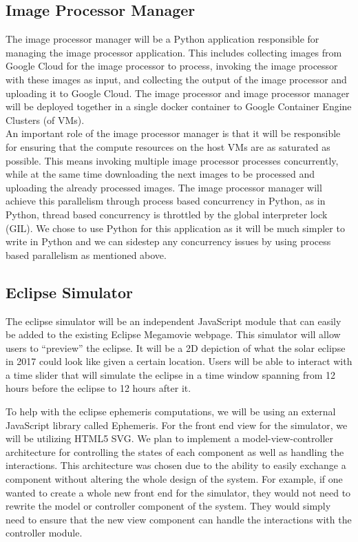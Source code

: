 \documentclass[10pt, onecolumn, draftclsnofoot, letterpaper, compsoc]{IEEEtran}
\begin{document}
\subsection{Image Processor Manager}

The image processor manager will be a Python application responsible for managing the image processor
application. This includes collecting images from Google Cloud for the image processor to process,
invoking the image processor with these images as input, and collecting the output of the image
processor and uploading it to Google Cloud. The image processor and image processor manager will be
deployed together in a single docker container to Google Container Engine Clusters (of VMs). \\

An important role of the image processor manager is that it will be responsible for ensuring that
the compute resources on the host VMs are as saturated as possible. This means invoking multiple
image processor processes concurrently, while at the same time downloading the next images to be
processed and uploading the already processed images. The image processor manager will achieve
this parallelism through process based concurrency in Python, as in Python, thread based concurrency
is throttled by the global interpreter lock (GIL). We chose to use Python for this application as it
will be much simpler to write in Python and we can sidestep any concurrency issues by using process
based parallelism as mentioned above. \\

\subsection{Eclipse Simulator}

The eclipse simulator will be an independent JavaScript module that can easily
be added to the existing Eclipse Megamovie webpage. This simulator will allow
users to “preview” the eclipse. It will be a 2D depiction of what the solar
eclipse in 2017 could look like given a certain location. Users will be able
to interact with a time slider that will simulate the eclipse in a time
window spanning from 12 hours before the eclipse to 12 hours after it.

To help with the eclipse ephemeris computations, we will be using an external
JavaScript library called Ephemeris. For the front end view for the simulator,
we will be utilizing HTML5 SVG. We plan to implement a model-view-controller
architecture for controlling the states of each component as well as handling
the interactions. This architecture was chosen due to the ability to easily
exchange a component without altering the whole design of the system. For
example, if one wanted to create a whole new front end for the simulator,
they would not need to rewrite the model or controller component of the system.
They would simply need to ensure that the new view component can handle the
interactions with the controller module.
\end{document}
